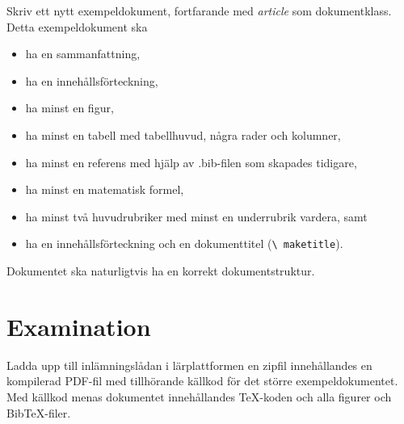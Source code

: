 \documentclass[a4paper,nocourse]{miunasgn}
\begin{document}
Skriv ett nytt exempeldokument, fortfarande med \emph{article} som 
dokumentklass.
Detta exempeldokument ska
\begin{itemize}
  \item ha en sammanfattning,
  \item ha en innehållsförteckning,
  \item ha minst en figur,
  \item ha minst en tabell med tabellhuvud, några rader och kolumner,
  \item ha minst en referens med hjälp av .bib-filen som skapades tidigare,
  \item ha minst en matematisk formel,
  \item ha minst två huvudrubriker med minst en underrubrik vardera, samt
  \item ha en innehållsförteckning och en dokumenttitel (\texttt{\textbackslash 
    maketitle}).
\end{itemize}
Dokumentet ska naturligtvis ha en korrekt dokumentstruktur.


\section{Examination}
\label{sec:Examination}
\noindent
Ladda upp till inlämningslådan i lärplattformen en zipfil innehållandes en 
kompilerad PDF-fil med tillhörande källkod för det större exempeldokumentet.
Med källkod menas dokumentet innehållandes TeX-koden och alla figurer och 
BibTeX-filer.


\printbibliography
\end{document}
